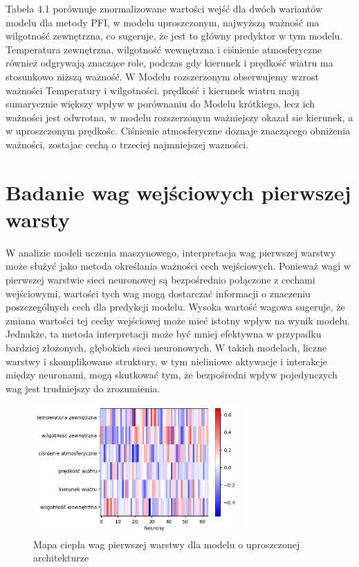 \documentclass[a4paper,twoside,12pt]{book}
\begin{document}
Tabela 4.1 porównuje znormalizowane wartości wejść dla dwóch wariantów modelu dla metody PFI, w modelu uproszczonym, najwyższą ważność ma wilgotność zewnętrzna, co sugeruje, że jest to główny predyktor w tym modelu. Temperatura zewnętrzna, wilgotność wewnętrzna i ciśnienie atmosferyczne również odgrywają znaczące role, podczas gdy kierunek i prędkość wiatru ma stosunkowo niższą ważność. W Modelu rozszerzonym obserwujemy wzrost ważności Temperatury i wilgotności. prędkość i kierunek wiatru mają sumarycznie większy wpływ w porównaniu do Modelu krótkiego, lecz ich ważności jest odwrotna, w modelu rozszerzonym ważniejszy okazał sie kierunek, a w uproszczonym prędkośc. Ciśnienie atmosferyczne doznaje znaczącego obniżenia ważności, zostajac cechą o trzeciej najmniejszej wazności.
\newpage
\section{Badanie wag wejściowych pierwszej warsty}
W analizie modeli uczenia maszynowego, interpretacja wag pierwszej warstwy może służyć jako metoda określania ważności cech wejściowych. Ponieważ wagi w pierwszej warstwie sieci neuronowej są bezpośrednio połączone z cechami wejściowymi, wartości tych wag mogą dostarczać informacji o znaczeniu poszczególnych cech dla predykcji modelu. Wysoka wartość wagowa sugeruje, że zmiana wartości tej cechy wejściowej może mieć istotny wpływ na wynik modelu. Jednakże, ta metoda interpretacji może być mniej efektywna w przypadku bardziej złożonych, głębokich sieci neuronowych. W takich modelach, liczne warstwy i skomplikowane struktury, w tym nieliniowe aktywacje i interakcje między neuronami, mogą skutkować tym, że bezpośredni wpływ pojedynczych wag jest trudniejszy do zrozumienia.
\begin{figure}[!h]
  \centering
  \includegraphics[width=0.7\textwidth]{img/heatmap1.png}
  \caption{Mapa ciepła wag pierwszej warstwy dla modelu o uproszczonej architekturze}
  \label{fig:etykieta-rysunku}
\end{figure}
\end{document}
